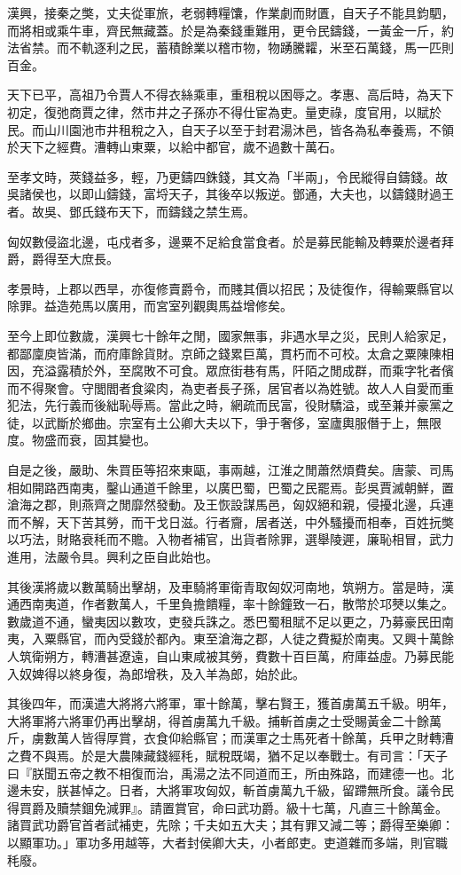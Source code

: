 
\begin{pinyinscope}
漢興，接秦之獘，丈夫從軍旅，老弱轉糧馕，作業劇而財匱，自天子不能具鈞駟，而將相或乘牛車，齊民無藏蓋。於是為秦錢重難用，更令民鑄錢，一黃金一斤，約法省禁。而不軌逐利之民，蓄積餘業以稽市物，物踴騰糶，米至石萬錢，馬一匹則百金。

天下已平，高祖乃令賈人不得衣絲乘車，重租稅以困辱之。孝惠、高后時，為天下初定，復弛商賈之律，然市井之子孫亦不得仕宦為吏。量吏祿，度官用，以賦於民。而山川園池市井租稅之入，自天子以至于封君湯沐邑，皆各為私奉養焉，不領於天下之經費。漕轉山東粟，以給中都官，歲不過數十萬石。

至孝文時，莢錢益多，輕，乃更鑄四銖錢，其文為「半兩」，令民縱得自鑄錢。故吳諸侯也，以即山鑄錢，富埒天子，其後卒以叛逆。鄧通，大夫也，以鑄錢財過王者。故吳、鄧氏錢布天下，而鑄錢之禁生焉。

匈奴數侵盜北邊，屯戍者多，邊粟不足給食當食者。於是募民能輸及轉粟於邊者拜爵，爵得至大庶長。

孝景時，上郡以西旱，亦復修賣爵令，而賤其價以招民；及徒復作，得輸粟縣官以除罪。益造苑馬以廣用，而宮室列觀輿馬益增修矣。

至今上即位數歲，漢興七十餘年之閒，國家無事，非遇水旱之災，民則人給家足，都鄙廩庾皆滿，而府庫餘貨財。京師之錢累巨萬，貫朽而不可校。太倉之粟陳陳相因，充溢露積於外，至腐敗不可食。眾庶街巷有馬，阡陌之閒成群，而乘字牝者儐而不得聚會。守閭閻者食粱肉，為吏者長子孫，居官者以為姓號。故人人自愛而重犯法，先行義而後絀恥辱焉。當此之時，網疏而民富，役財驕溢，或至兼并豪黨之徒，以武斷於鄉曲。宗室有土公卿大夫以下，爭于奢侈，室廬輿服僭于上，無限度。物盛而衰，固其變也。

自是之後，嚴助、朱買臣等招來東甌，事兩越，江淮之閒蕭然煩費矣。唐蒙、司馬相如開路西南夷，鑿山通道千餘里，以廣巴蜀，巴蜀之民罷焉。彭吳賈滅朝鮮，置滄海之郡，則燕齊之閒靡然發動。及王恢設謀馬邑，匈奴絕和親，侵擾北邊，兵連而不解，天下苦其勞，而干戈日滋。行者齎，居者送，中外騷擾而相奉，百姓抏獘以巧法，財賂衰秏而不贍。入物者補官，出貨者除罪，選舉陵遲，廉恥相冒，武力進用，法嚴令具。興利之臣自此始也。

其後漢將歲以數萬騎出擊胡，及車騎將軍衛青取匈奴河南地，筑朔方。當是時，漢通西南夷道，作者數萬人，千里負擔饋糧，率十餘鐘致一石，散幣於邛僰以集之。數歲道不通，蠻夷因以數攻，吏發兵誅之。悉巴蜀租賦不足以更之，乃募豪民田南夷，入粟縣官，而內受錢於都內。東至滄海之郡，人徒之費擬於南夷。又興十萬餘人筑衛朔方，轉漕甚遼遠，自山東咸被其勞，費數十百巨萬，府庫益虛。乃募民能入奴婢得以終身復，為郎增秩，及入羊為郎，始於此。

其後四年，而漢遣大將將六將軍，軍十餘萬，擊右賢王，獲首虜萬五千級。明年，大將軍將六將軍仍再出擊胡，得首虜萬九千級。捕斬首虜之士受賜黃金二十餘萬斤，虜數萬人皆得厚賞，衣食仰給縣官；而漢軍之士馬死者十餘萬，兵甲之財轉漕之費不與焉。於是大農陳藏錢經秏，賦稅既竭，猶不足以奉戰士。有司言：「天子曰『朕聞五帝之教不相復而治，禹湯之法不同道而王，所由殊路，而建德一也。北邊未安，朕甚悼之。日者，大將軍攻匈奴，斬首虜萬九千級，留蹛無所食。議令民得買爵及贖禁錮免減罪』。請置賞官，命曰武功爵。級十七萬，凡直三十餘萬金。諸買武功爵官首者試補吏，先除；千夫如五大夫；其有罪又減二等；爵得至樂卿：以顯軍功。」軍功多用越等，大者封侯卿大夫，小者郎吏。吏道雜而多端，則官職秏廢。


\end{pinyinscope}
